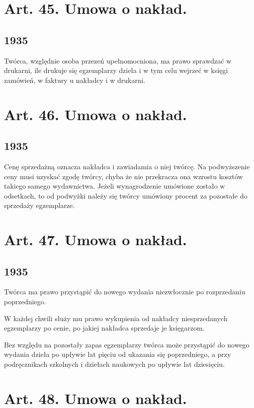 \documentclass[withmarginpar]{book}
\begin{document}
\section{Art. 45. Umowa o nakład.}
\label{sec:art.-45}
\subsection{1935}
\label{sec:art.-45-1}

Twórca, względnie osoba przezeń upełnomocniona, ma prawo sprawdzać w
drukarni, ile drukuje się egzemplarzy dzieła i w tym celu wejrzeć w
księgi zamówień, w faktury u nakładcy i w drukarni.

\section{Art. 46. Umowa o nakład.}
\label{sec:art.-46}
\subsection{1935}
\label{sec:art.-46-1}

Cenę sprzedażną oznacza nakładca i zawiadamia o niej twórcę. Na
podwyższenie ceny musi uzyskać zgodę twórcy, chyba że nie przekracza
ona wzrostu kosztów takiego samego wydawnictwa. Jeżeli wynagrodzenie
umówione zostało w odsetkach, to od podwyżki należy się twórcy
umówiony procent za pozostałe do sprzedaży egzemplarze.

\section{Art. 47. Umowa o nakład.}
\label{sec:art.-47}
\subsection{1935}
\label{sec:art.-47-1}

Twórca ma prawo przystąpić do nowego wydania niezwłocznie po
rozprzedaniu poprzedniego.

W każdej chwili służy mu prawo wykupienia od nakładcy niesprzedanych
egzemplarzy po cenie, po jakiej nakładca sprzedaje je księgarzom.

Bez względu na pozostały zapas egzemplarzy twórca może przystąpić do
nowego wydania dzieła po upływie lat pięciu od ukazania się
poprzedniego, a przy podręcznikach szkolnych i dziełach naukowych po
upływie lat dziesięciu.

\section{Art. 48. Umowa o nakład.}
\label{sec:art.-48}
\end{document}
